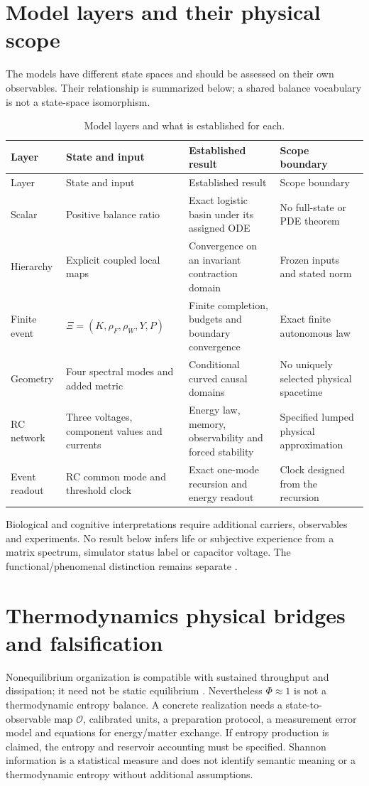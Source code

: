 \documentclass[11pt,letterpaper]{article}
\theoremstyle{definition}
\numberwithin{equation}{section}
\begin{document}
\section{Model layers and their physical scope}
The models have different state spaces and should be assessed on their own observables. Their relationship is summarized below; a shared balance vocabulary is not a state-space isomorphism.
\begin{longtable}{p{}p{}p{}p{}}
\caption{Model layers and what is established for each.}\label{tab:triads}\\
\toprule Layer & State and input & Established result & Scope boundary\\\midrule\endfirsthead
\toprule Layer & State and input & Established result & Scope boundary\\\midrule\endhead
Scalar & Positive balance ratio & Exact logistic basin under its assigned ODE & No full-state or PDE theorem\\
Hierarchy & Explicit coupled local maps & Convergence on an invariant contraction domain & Frozen inputs and stated norm\\
Finite event & $\Xi=(K,\rho_F,\rho_W,Y,P)$ & Finite completion, budgets and boundary convergence & Exact finite autonomous law\\
Geometry & Four spectral modes and added metric & Conditional curved causal domains & No uniquely selected physical spacetime\\
RC network & Three voltages, component values and currents & Energy law, memory, observability and forced stability & Specified lumped physical approximation\\
Event readout & RC common mode and threshold clock & Exact one-mode recursion and energy readout & Clock designed from the recursion\\
\bottomrule\end{longtable}
Biological and cognitive interpretations require additional carriers, observables and experiments. No result below infers life or subjective experience from a matrix spectrum, simulator status label or capacitor voltage. The functional/phenomenal distinction remains separate \cite{pereira}.

\section{Thermodynamics physical bridges and falsification}
Nonequilibrium organization is compatible with sustained throughput and dissipation; it need not be static equilibrium \cite{prigogine}. Nevertheless $\Phi\approx1$ is not a thermodynamic entropy balance. A concrete realization needs a state-to-observable map $\mathcal O$, calibrated units, a preparation protocol, a measurement error model and equations for energy/matter exchange. If entropy production is claimed, the entropy and reservoir accounting must be specified. Shannon information \cite{shannon} is a statistical measure and does not identify semantic meaning or a thermodynamic entropy without additional assumptions.
\end{document}
